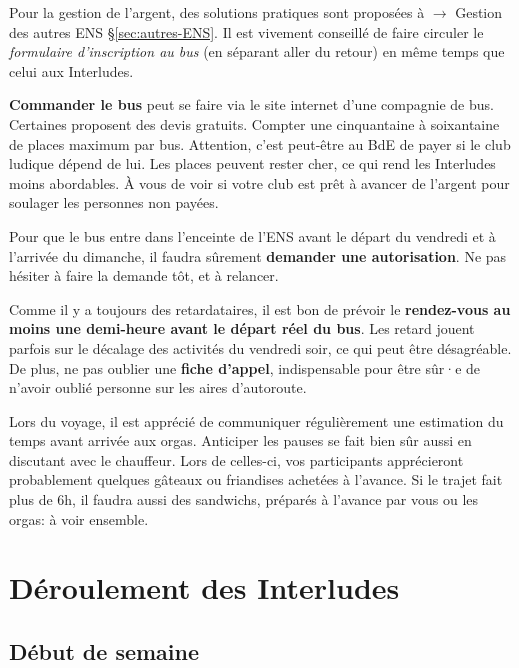Pour la gestion de l'argent, des solutions pratiques sont proposées à $\to$ Gestion des autres ENS \S\ref{sec:autres-ENS}. Il est vivement conseillé de faire circuler le \emph{formulaire d'inscription au bus} (en séparant aller du retour) en même temps que celui aux Interludes.

\textbf{Commander le bus} peut se faire via le site internet d'une compagnie de bus. Certaines proposent des devis gratuits. Compter une cinquantaine à soixantaine de places maximum par bus. Attention, c'est peut-être au BdE de payer si le club ludique dépend de lui. Les places peuvent rester cher, ce qui rend les Interludes moins abordables. À vous de voir si votre club est prêt à avancer de l'argent pour soulager les personnes non payées.

\begin{Aanticiper}{}{}
Pour que le bus entre dans l'enceinte de l'ENS avant le départ du vendredi et à l'arrivée du dimanche, il faudra sûrement \textbf{demander une autorisation}. Ne pas hésiter à faire la demande tôt, et à relancer.
\end{Aanticiper}

\begin{Afaire}{}{}
Comme il y a toujours des retardataires, il est bon de prévoir le \textbf{rendez-vous au moins une demi-heure avant le départ réel du bus}. Les retard jouent parfois sur le décalage des activités du vendredi soir, ce qui peut être désagréable. De plus, ne pas oublier une \textbf{fiche d'appel}, indispensable pour être sûr·e de n'avoir oublié personne sur les aires d'autoroute.
\end{Afaire}

Lors du voyage, il est apprécié de communiquer régulièrement une estimation du temps avant arrivée aux orgas. Anticiper les pauses se fait bien sûr aussi en discutant avec le chauffeur. Lors de celles-ci, vos participants apprécieront probablement quelques gâteaux ou friandises achetées à l'avance. Si le trajet fait plus de 6h, il faudra aussi des sandwichs, préparés à l'avance par vous ou les orgas: à voir ensemble.


\section{Déroulement des Interludes}

\subsection{Début de semaine}

